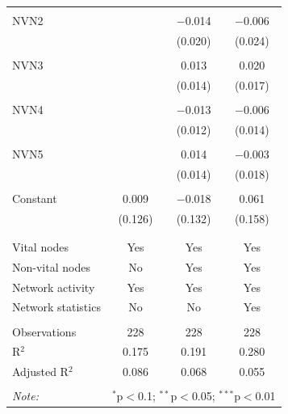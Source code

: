 \begin{table}[!htbp]
\begin{tabular}{@{\extracolsep{5pt}}lccc}
  & & & \\ 
 NVN2 &  & $-$0.014 & $-$0.006 \\ 
  &  & (0.020) & (0.024) \\ 
  & & & \\ 
 NVN3 &  & 0.013 & 0.020 \\ 
  &  & (0.014) & (0.017) \\ 
  & & & \\ 
 NVN4 &  & $-$0.013 & $-$0.006 \\ 
  &  & (0.012) & (0.014) \\ 
  & & & \\ 
 NVN5 &  & 0.014 & $-$0.003 \\ 
  &  & (0.014) & (0.018) \\ 
  & & & \\ 
 Constant & 0.009 & $-$0.018 & 0.061 \\ 
  & (0.126) & (0.132) & (0.158) \\ 
  & & & \\ 
\hline \\[-1.8ex] 
Vital nodes & Yes & Yes & Yes \\ 
Non-vital nodes & No & Yes & Yes \\ 
Network activity & Yes & Yes & Yes \\ 
Network statistics & No & No & Yes \\ 
\hline &  &  &  \\ 
Observations & 228 & 228 & 228 \\ 
R$^{2}$ & 0.175 & 0.191 & 0.280 \\ 
Adjusted R$^{2}$ & 0.086 & 0.068 & 0.055 \\ 
\hline 
\hline \\[-1.8ex] 
\textit{Note:}  & \multicolumn{3}{r}{$^{*}$p$<$0.1; $^{**}$p$<$0.05; $^{***}$p$<$0.01} \\ 
\end{tabular} 
\end{table} 
